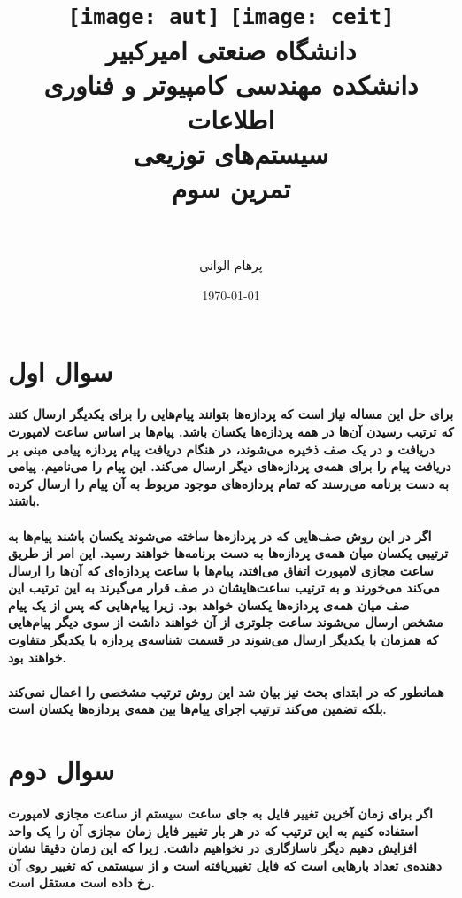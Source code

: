 \documentclass[paper=a4, fontsize=11pt]{article}
\title{
\normalfont\normalsize
\texttt{[image: aut]}
\hspace{5cm}
\texttt{[image: ceit]} \\
\textsc دانشگاه صنعتی امیرکبیر \\
\textsc دانشکده مهندسی کامپیوتر و فناوری اطلاعات
\horrule{0.5pt} \\ [0.4cm] %
\huge سیستم‌های توزیعی \\ %
\huge تمرین سوم \\ %
\horrule{2pt} \\ [0.5cm] %
}
\author{پرهام الوانی}
\date{\normalsize\today} %
\numberwithin{equation}{section} %
\numberwithin{figure}{section} %
\numberwithin{table}{section} %
\begin{document}
\maketitle %

\section{سوال اول}
\paragraph{
    برای حل این مساله نیاز است که پردازه‌ها بتوانند پیام‌هایی را برای یکدیگر ارسال کنند که ترتیب رسیدن آن‌ها در همه پردازه‌ها یکسان باشد.
    پیام‌ها بر اساس ساعت لامپورت دریافت و در یک صف ذخیره می‌شوند، در هنگام دریافت پیام پردازه‌ پیامی مبنی بر دریافت پیام را برای همه‌ی پردازه‌های دیگر ارسال می‌کند.
    این پیام را  می‌نامیم.
    پیامی به دست برنامه می‌رسند که تمام پردازه‌های موجود 
    مربوط به آن پیام را ارسال کرده باشند.
}
\paragraph{
    اگر در این روش صف‌هایی که در پردازه‌ها ساخته می‌شوند یکسان باشند پیام‌ها به ترتیبی یکسان میان همه‌ی پردازه‌ها به دست برنامه‌ها خواهند رسید.
    این امر از طریق ساعت مجازی لامپورت اتفاق می‌افتد، پیام‌ها با ساعت پردازه‌ای که آن‌ها را ارسال می‌کند  می‌خورند
    و به ترتیب ساعت‌هایشان در صف قرار می‌گیرند به این ترتیب این صف میان همه‌ی پردازه‌ها یکسان خواهد بود.
    زیرا پیام‌هایی که پس از یک پیام مشخص ارسال می‌شوند ساعت جلوتری از آن خواهند داشت از سوی دیگر
    پیام‌هایی که همزمان با یکدیگر ارسال می‌شوند در قسمت شناسه‌ی پردازه با یکدیگر متفاوت خواهند بود.
}
\paragraph{
    همانطور که در ابتدای بحث نیز بیان شد این روش ترتیب مشخصی را اعمال نمی‌کند بلکه تضمین می‌کند ترتیب اجرای پیام‌ها بین همه‌ی پردازه‌ها یکسان است.
}

\section{سوال دوم}
\paragraph{
    اگر برای زمان آخرین تغییر فایل به جای ساعت سیستم از ساعت مجازی لامپورت استفاده کنیم به این ترتیب که
    در هر بار تغییر فایل زمان مجازی آن را یک واحد افزایش دهیم دیگر ناسازگاری در 
    نخواهیم داشت.
    زیرا که این زمان دقیقا نشان دهنده‌ی تعداد بارهایی است که فایل تغییریافته است و
    از سیستمی که تغییر روی آن رخ داده است مستقل است.
}
\end{document}
